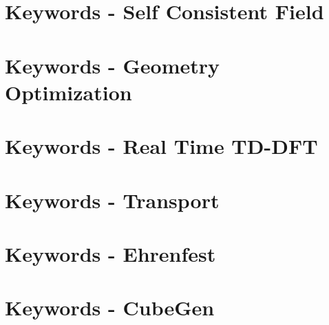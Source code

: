 \section{Keywords - Self Consistent Field}


\newpage
\section{Keywords - Geometry Optimization}


\newpage
\section{Keywords - Real Time TD-DFT}


\newpage
\section{Keywords - Transport}


\newpage
\section{Keywords - Ehrenfest}


\newpage
\section{Keywords - CubeGen}


\newpage
